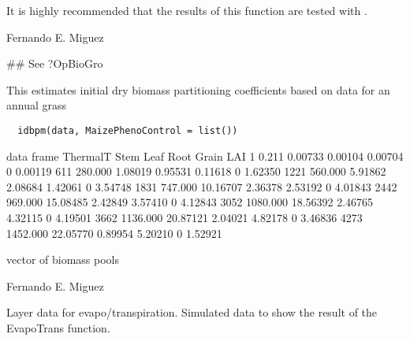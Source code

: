 \documentclass[letterpaper]{book}
\begin{document}
%
\begin{Note}\relax
It is highly recommended that the results of this
function are tested with .
\end{Note}
%
\begin{Author}\relax
Fernando E. Miguez
\end{Author}
%
\begin{SeeAlso}\relax
{}
\end{SeeAlso}
%
\begin{Examples}
\begin{ExampleCode}
## See ?OpBioGro
\end{ExampleCode}
\end{Examples}
%
\begin{Description}\relax
This estimates initial dry biomass partitioning
coefficients based on data for an annual grass
\end{Description}
%
\begin{Usage}
\begin{verbatim}
  idbpm(data, MaizePhenoControl = list())
\end{verbatim}
\end{Usage}
%
\begin{Arguments}
\begin{ldescription}
\item[\code{data}] data frame ThermalT Stem Leaf Root Grain LAI
1 0.211 0.00733 0.00104 0.00704 0 0.00119 611 280.000
1.08019 0.95531 0.11618 0 1.62350 1221 560.000 5.91862
2.08684 1.42061 0 3.54748 1831 747.000 10.16707 2.36378
2.53192 0 4.01843 2442 969.000 15.08485 2.42849 3.57410 0
4.12843 3052 1080.000 18.56392 2.46765 4.32115 0 4.19501
3662 1136.000 20.87121 2.04021 4.82178 0 3.46836 4273
1452.000 22.05770 0.89954 5.20210 0 1.52921

\item[\code{MaizePhenoControl}] 
\end{ldescription}
\end{Arguments}
%
\begin{Value}
vector of biomass pools
\end{Value}
%
\begin{Author}\relax
Fernando E. Miguez
\end{Author}
%
\begin{Description}\relax
Layer data for evapo/transpiration. Simulated data to
show the result of the EvapoTrans function.
\end{Description}
\end{document}
